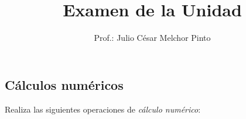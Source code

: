 \documentclass[12pt,addpoints]{evalua}
\title{Examen de la Unidad}
\author{Prof.: Julio César Melchor Pinto}
\begin{document}
%
\begin{multicols}{2}
	\tableofcontents
\end{multicols}\newpage
\begin{questions}\large
	\section{Cálculos numéricos}

      \question[10] Realiza las siguientes operaciones de \textit{cálculo numérico}:
   
      \begin{parts}
\end{parts}
\end{questions}
\end{document}
